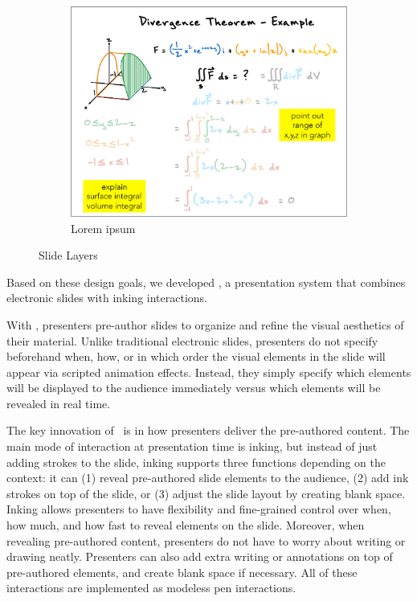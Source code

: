 \begin{figure}[ht!]
\begin{subfigure}[t]{0.32\textwidth}
    \end{subfigure}
    ~
        \begin{subfigure}[t]{0.32\textwidth}
        \centering
        \includegraphics[width=1\columnwidth]{figures/videoslide3}
        \caption{Lorem ipsum}
    \end{subfigure}
    \caption{Slide Layers}
\end{figure}

Based on these design goals, we developed \interface, a presentation system that combines electronic slides with inking interactions. 

With \interface, presenters pre-author slides to organize and refine the visual aesthetics of their material.
%
Unlike traditional electronic slides, presenters do not specify beforehand when, how, or in which order the visual elements in the slide will appear via scripted animation effects. Instead, they simply specify which elements will be displayed to the audience immediately versus which elements will be revealed in real time. 

The key innovation of \interface\ is in how presenters deliver the pre-authored content.  The main mode of interaction at presentation time is inking, but instead of just adding strokes to the slide, inking supports three functions depending on the context: it can (1) reveal pre-authored slide elements to the audience, (2) add ink strokes on top of the slide, or (3) adjust the slide layout by creating blank space. Inking allows presenters to have flexibility and fine-grained control over when, how much, and how fast to reveal elements on the slide.
%
Moreover, when revealing pre-authored content, presenters do not have to worry about writing or drawing neatly.
%
Presenters can also add extra writing or annotations on top of pre-authored elements, and create blank space if necessary. 
%
All of these interactions are implemented as modeless pen interactions.

